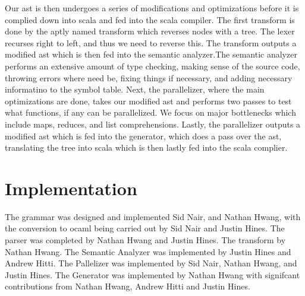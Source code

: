 Our ast is then undergoes a series of modifications and optimizations
before it is complied down into scala and fed into the scala compiler.
The first transform is done by the aptly named transform which
reverses nodes with a tree.  The lexer recurses right to left, and
thus we need to reverse this.  The transform outputs a modified ast
which is then fed into the semantic analyzer.The semantic analyzer
performs an extensive amount of type checking, making sense of the
source code, throwing errors where need be, fixing things if
necessary, and adding necessary informatino to the symbol table.
Next, the parallelizer, where the main optimizations are done, takes
our modified ast and performs two passes to test what functions, if
any can be parallelized. We focus on major bottlenecks which include
maps, reduces, and list comprehensions. Lastly, the parallelizer
outputs a modified ast which is fed into the generator, which does a
pass over the ast, translating the tree into scala which is then
lastly fed into the scala complier.

\section{Implementation}
The grammar was designed and implemented Sid Nair, and Nathan Hwang,
with the conversion to ocaml being carried out by Sid Nair and Justin
Hines.  The parser was completed by Nathan Hwang and Justin Hines.
The transform by Nathan Hwang.  The Semantic Analyzer was implemented
by Justin Hines and Andrew Hitti.  The Pallelizer was implemented by
Sid Nair, Nathan Hwang, and Justin Hines. The Generator was
implemented by Nathan Hwang with signifcant contributions from Nathan
Hwang, Andrew Hitti and Justin Hines.
